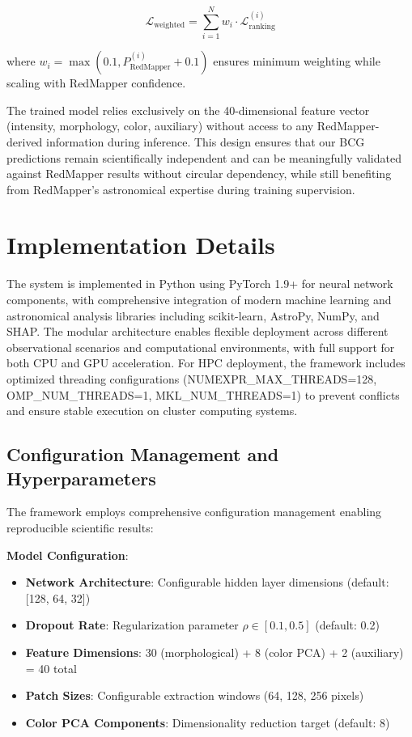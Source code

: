 \documentclass[twocolumn,10pt]{aastex631}
\begin{document}
\begin{equation}
\mathcal{L}_{\text{weighted}} = \sum_{i=1}^{N} w_i \cdot \mathcal{L}_{\text{ranking}}^{(i)}
\end{equation}

where $w_i = \max(0.1, P_{\text{RedMapper}}^{(i)} + 0.1)$ ensures minimum weighting while scaling with RedMapper confidence.

The trained model relies exclusively on the 40-dimensional feature vector (intensity, morphology, color, auxiliary) without access to any RedMapper-derived information during inference. This design ensures that our BCG predictions remain scientifically independent and can be meaningfully validated against RedMapper results without circular dependency, while still benefiting from RedMapper's astronomical expertise during training supervision.

\section{Implementation Details}

The system is implemented in Python using PyTorch 1.9+ for neural network components, with comprehensive integration of modern machine learning and astronomical analysis libraries including scikit-learn, AstroPy, NumPy, and SHAP. The modular architecture enables flexible deployment across different observational scenarios and computational environments, with full support for both CPU and GPU acceleration. For HPC deployment, the framework includes optimized threading configurations (NUMEXPR\_MAX\_THREADS=128, OMP\_NUM\_THREADS=1, MKL\_NUM\_THREADS=1) to prevent conflicts and ensure stable execution on cluster computing systems.

\subsection{Configuration Management and Hyperparameters}

The framework employs comprehensive configuration management enabling reproducible scientific results:

\textbf{Model Configuration}:
\begin{itemize}
\item \textbf{Network Architecture}: Configurable hidden layer dimensions (default: [128, 64, 32])
\item \textbf{Dropout Rate}: Regularization parameter $\rho \in [0.1, 0.5]$ (default: 0.2)
\item \textbf{Feature Dimensions}: 30 (morphological) + 8 (color PCA) + 2 (auxiliary) = 40 total
\item \textbf{Patch Sizes}: Configurable extraction windows (64, 128, 256 pixels)
\item \textbf{Color PCA Components}: Dimensionality reduction target (default: 8)
\end{itemize}
\end{document}
